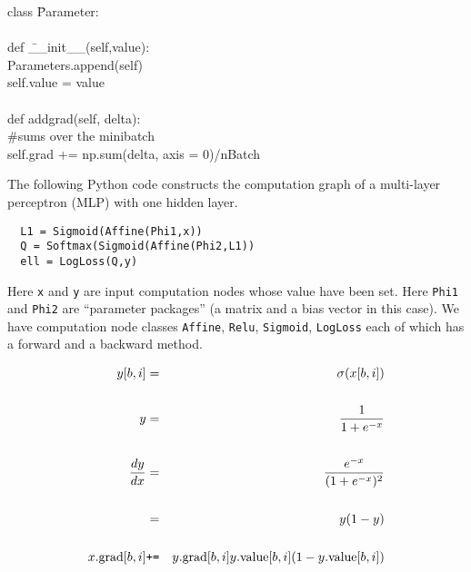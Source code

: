 {

\begin{tabbing}
class \=Parameter: \\
    \\
    \>def \=\_\_init\_\_(self,value): \\
        \>\>Parameters.append(self) \\
        \>\>self.value = value \\
\\
    \>def \>addgrad(self, delta): \\
          \>\>\#sums over the minibatch \\
    \>\>self.grad += np.sum(delta, axis = 0)/nBatch \\
\end{tabbing}

\medskip

The following Python code constructs the computation graph of a multi-layer perceptron (MLP) with one hidden layer.

\vfill
\begin{verbatim}
  L1 = Sigmoid(Affine(Phi1,x))
  Q = Softmax(Sigmoid(Affine(Phi2,L1))
  ell = LogLoss(Q,y)
\end{verbatim}

\vfill
Here {\tt x} and {\tt y} are input computation nodes
whose value have been set.
Here {\tt Phi1} and {\tt Phi2} are ``parameter packages'' (a matrix and a bias vector in this case).
We have computation node classes {\tt Affine}, {\tt Relu}, {\tt Sigmoid}, {\tt LogLoss} each of which has
a forward and a backward method.


\begin{eqnarray*}
y[b,i] & = &  \sigma(x[b,i]) \\
\\
y & = & \frac{1}{1 + e^{-x}} \\
\\
\frac{d y}{dx} & = & \frac{e^{-x}}{(1 + e^{-x})^2} \\
\\
& = & y(1-y) \\
\\
x.\mathrm{grad}[b,i] & \mbox{\tt +=} & y.\mathrm{grad}[b,i]y.\mathrm{value}[b,i](1-y.\mathrm{value}[b,i])
\end{eqnarray*}




}

